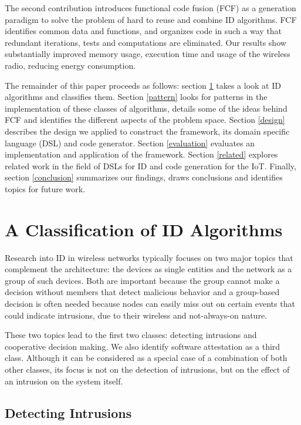 \documentclass[conference]{IEEEtran}
\begin{document}

The second contribution introduces functional code fusion (FCF) as a generation
paradigm to solve the problem of hard to reuse and combine ID algorithms. FCF
identifies common data and functions, and organizes code in such a way that
redundant iterations, tests and computations are eliminated. Our results show
substantially improved memory usage, execution time and usage of the wireless
radio, reducing energy consumption.


The remainder of this paper proceeds as follows: section \ref{classification}
takes a look at ID algorithms and classifies them. Section \ref{pattern} looks
for patterns in the implementation of these classes of algorithms, details some
of the ideas behind FCF and identifies the different aspects of the problem
space. Section \ref{design} describes the design we applied to construct the
framework, its domain specific language (DSL) and code generator. Section
\ref{evaluation} evaluates an implementation and application of the framework.
Section \ref{related} explores related work in the field of DSLs for ID and
code generation for the IoT. Finally, section \ref{conclusion} summarizes our
findings, draws conclusions and identifies topics for future work.

\section{A Classification of ID Algorithms}
\label{classification}

Research into ID in wireless networks typically focuses on two major topics
that complement the architecture: the devices as single entities and the
network as a group of such devices. Both are important because the group cannot
make a decision without members that detect malicious behavior and a
group-based decision is often needed because nodes can easily miss out on
certain events that could indicate intrusions, due to their wireless and
not-always-on nature.

These two topics lead to the first two classes: detecting intrusions and
cooperative decision making. We also identify software attestation as a third
class. Although it can be considered as a special case of a combination of both
other classes, its focus is not on the detection of intrusions, but on the
effect of an intrusion on the system itself.

\subsection*{Detecting Intrusions}
\label{detection}
\end{document}
